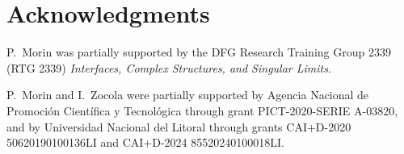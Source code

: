 \documentclass{article}
\begin{document}

\section{Acknowledgments}

P.\ Morin was partially supported by the DFG Research Training Group 2339 (RTG 2339) \emph{Interfaces, Complex Structures, and Singular Limits}.

P.\ Morin and I.\ Zocola were partially supported by Agencia Nacional de Promoci\'on Cient\'ifica y Tecnol\'ogica through grant PICT-2020-SERIE A-03820, and by Universidad Nacional del Litoral through grants CAI+D-2020 50620190100136LI and CAI+D-2024 85520240100018LI.


\end{document}
